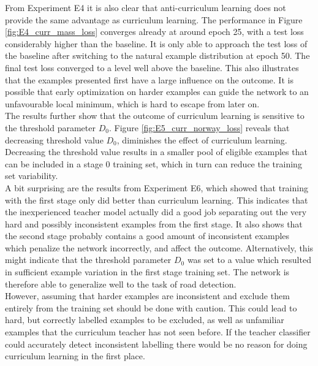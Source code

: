 From Experiment E4 it is also clear that anti-curriculum learning does not provide the same advantage as curriculum learning. The performance in Figure \ref{fig:E4_curr_mass_loss} converges already at around epoch 25, with a test loss considerably higher than the baseline. It is only able to approach the test loss of the baseline after switching to the natural example distribution at epoch 50. The final test loss converged to a level well above the baseline. This also illustrates that the examples presented first have a large influence on the outcome. It is possible that early optimization on harder examples can guide the network to an unfavourable local minimum, which is hard to escape from later on.\\

The results further show that the outcome of curriculum learning is sensitive to the threshold parameter $D_0$. Figure \ref{fig:E5_curr_norway_loss} reveals that decreasing threshold value $D_0$, diminishes the effect of curriculum learning. Decreasing the threshold value results in a smaller pool of eligible examples that can be included in a stage 0 training set, which in turn can reduce the training set variability.\\ 

A bit surprising are the results from Experiment E6, which showed that training with the first stage only did better than curriculum learning. This indicates that the inexperienced teacher model actually did a good job separating out the very hard and possibly inconsistent examples from the first stage. It also shows that the second stage probably contains a good amount of inconsistent examples which penalize the network incorrectly, and affect the outcome. Alternatively, this might indicate that the threshold parameter $D_0$ was set to a value which resulted in sufficient example variation in the first stage training set. The network is therefore able to generalize well to the task of road detection.\\

However, assuming that harder examples are inconsistent and exclude them entirely from the training set should be done with caution. This could lead to hard, but correctly labelled examples to be excluded, as well as unfamiliar examples that the curriculum teacher has not seen before. If the teacher classifier could accurately detect inconsistent labelling there would be no reason for doing curriculum learning in the first place.\\ 

